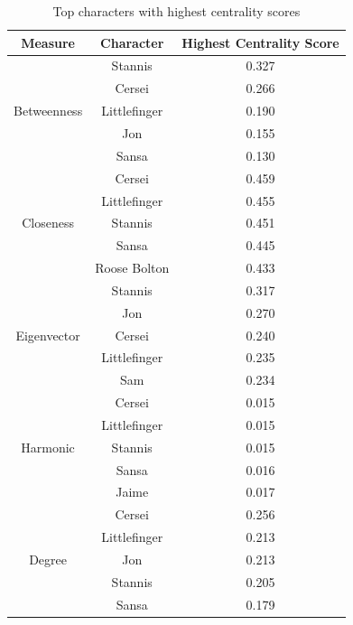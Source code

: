 \documentclass[10pt,twocolumn,letterpaper]{article}
\begin{document}
\begin{table}[!h]
    \centering
    \small
    \begin{tabular}{c|c|c}
        Measure & Character & \small{Highest Centrality Score} \\
        \hline
                    & Stannis & 0.327 \\
                    & Cersei & 0.266 \\
        Betweenness & Littlefinger & 0.190 \\
                    & Jon & 0.155 \\
                    & Sansa & 0.130 \\
        \hline 
                    & Cersei & 0.459 \\
                    & Littlefinger & 0.455 \\
        Closeness   & Stannis & 0.451 \\
                    & Sansa & 0.445 \\
                    & Roose Bolton & 0.433 \\
        \hline 
                    & Stannis & 0.317 \\
                    & Jon & 0.270 \\
        Eigenvector & Cersei & 0.240 \\
                    & Littlefinger & 0.235 \\
                    & Sam & 0.234 \\
        \hline 
                    & Cersei & 0.015 \\
                    & Littlefinger & 0.015 \\
        Harmonic    & Stannis & 0.015 \\
                    & Sansa & 0.016 \\
                    & Jaime & 0.017 \\
        \hline
                    & Cersei & 0.256 \\
                    & Littlefinger & 0.213 \\
        Degree      & Jon & 0.213 \\
                    & Stannis & 0.205 \\
                    & Sansa & 0.179 \\
        \hline
    \end{tabular}
    \vspace{0.2cm}
    \caption{Top characters with highest centrality scores}
    \label{tab:my_label}
\end{table}
\end{document}
